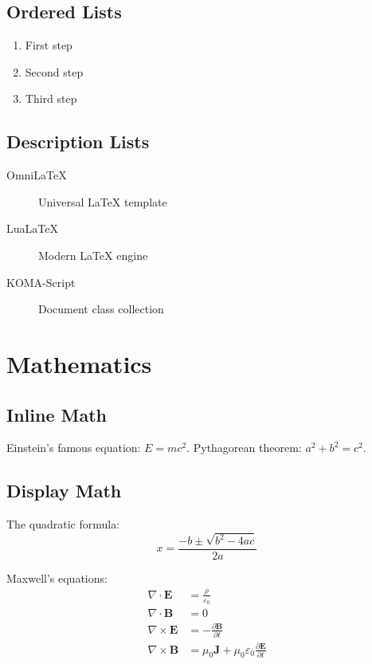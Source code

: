 \documentclass[
    language=english,
    institution=none,        %
    oneside,                 %
    loadGlossaries,          %
]{../../omnilatex}
\begin{document}
\section{Ordered Lists}

\begin{enumerate}
    \item First step
    \item Second step
    \item Third step
\end{enumerate}

\section{Description Lists}

\begin{description}
    \item[OmniLaTeX] Universal LaTeX template
    \item[LuaLaTeX] Modern LaTeX engine
    \item[KOMA-Script] Document class collection
\end{description}

\chapter{Mathematics}

\section{Inline Math}

Einstein's famous equation: $E = mc^2$.
Pythagorean theorem: $a^2 + b^2 = c^2$.

\section{Display Math}

The quadratic formula:
\begin{equation}
    x = \frac{-b \pm \sqrt{b^2 - 4ac}}{2a}
    \label{eq:quadratic}
\end{equation}

Maxwell's equations:
\begin{align}
    \nabla \cdot \mathbf{E} &= \frac{\rho}{\varepsilon_0} \\
    \nabla \cdot \mathbf{B} &= 0 \\
    \nabla \times \mathbf{E} &= -\frac{\partial \mathbf{B}}{\partial t} \\
    \nabla \times \mathbf{B} &= \mu_0 \mathbf{J} + \mu_0\varepsilon_0 \frac{\partial \mathbf{E}}{\partial t}
\end{align}
\end{document}

